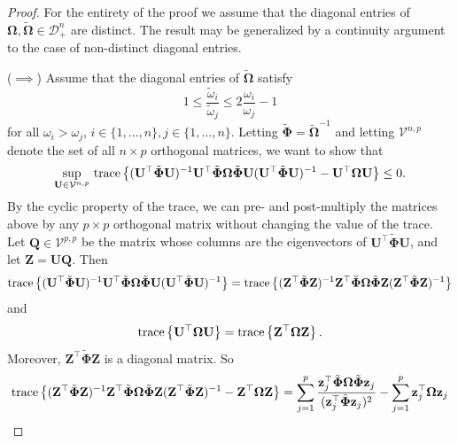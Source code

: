 \documentclass[12pt]{article}
\newcommand{\tr}{\text{\rm trace}}
\newcommand{\bl}[1]{{\mathbf #1}}
\newcommand{\bs}[1]{\boldsymbol #1}
\begin{document}
\begin{proof}

For the entirety of the proof we assume that the diagonal entries of $\bs{\Omega}, \tilde{\bs{\Omega}} \in \mathcal{D}_+^n$ are distinct. The result may be generalized by a continuity argument to the case of non-distinct diagonal entries.

($\implies$) Assume that the diagonal entries of $\tilde{\bs{\Omega}}$ satisfy
\begin{equation*}
    1 \leq \frac{\tilde{\omega}_i}{\tilde{\omega}_j} \leq 2\frac{\omega_i}{\omega_j} - 1
\end{equation*}
for all $\omega_i > \omega_j$, $i \in \{1, \dots, n\}, j \in \{1, \dots, n\}$. Letting $\tilde{\bs{\Phi}} = \tilde{\bs{\Omega}}^{-1}$ and letting $\mathcal{V}^{n,p}$ denote the set of all $n\times p$ orthogonal matrices, we want to show that
\begin{equation}\label{eq:sups2}
    \underset{\bl{U} \in \mathcal{V}^{n,p}}{\sup}~\tr \left\{(\bl{U}^\top \tilde{\bs{\Phi}} \bl{U})^{-1} \bl{U}^\top \tilde{\bs{\Phi}} \bs{\Omega} \tilde{\bs{\Phi}} \bl{U} (\bl{U}^\top \tilde{\bs{\Phi}} \bl{U})^{-1} - \bl{U}^\top \bs{\Omega} \bl{U} \right\} \leq 0.
\end{equation}
By the cyclic property of the trace, we can pre- and post-multiply the matrices above by any $p \times p$ orthogonal matrix without changing the value of the trace. Let $\bl{Q} \in \mathcal{V}^{p,p}$ be the matrix whose columns are the eigenvectors of $\bl{U}^\top \tilde{\bs{\Phi}} \bl{U}$, and let $\bl{Z} = \bl{U}\bl{Q}$. Then
\begin{equation*}
    \tr \left\{(\bl{U}^\top \tilde{\bs{\Phi}} \bl{U})^{-1} \bl{U}^\top \tilde{\bs{\Phi}} \bs{\Omega} \tilde{\bs{\Phi}} \bl{U} (\bl{U}^\top \tilde{\bs{\Phi}} \bl{U})^{-1}\right\} = \tr \left\{(\bl{Z}^\top \tilde{\bs{\Phi}} \bl{Z})^{-1} \bl{Z}^\top \tilde{\bs{\Phi}} \bs{\Omega} \tilde{\bs{\Phi}} \bl{Z} (\bl{Z}^\top \tilde{\bs{\Phi}} \bl{Z})^{-1} \right\} 
\end{equation*}
and
\begin{equation*}
    \tr\left\{ \bl{U}^\top \bs{\Omega} \bl{U} \right\} = \tr\left\{ \bl{Z}^\top \bs{\Omega} \bl{Z} \right\}.
\end{equation*}
Moreover, $\bl{Z}^\top \tilde{\bs{\Phi}} \bl{Z}$ is a diagonal matrix. So
\begin{equation*}
\begin{aligned}
    \tr \left\{(\bl{Z}^\top \tilde{\bs{\Phi}} \bl{Z})^{-1} \bl{Z}^\top \tilde{\bs{\Phi}} \bs{\Omega} \tilde{\bs{\Phi}} \bl{Z} (\bl{Z}^\top \tilde{\bs{\Phi}} \bl{Z})^{-1} - \bl{Z}^\top \bs{\Omega} \bl{Z} \right\} &= \sum_{j=1}^p \frac{\bl{z}_j^\top \tilde{\bs{\Phi}} \bs{\Omega} \tilde{\bs{\Phi}}\bl{z}_j}{(\bl{z}_j^\top \tilde{\bs{\Phi}} \bl{z}_j)^2} - \sum_{j=1}^p \bl{z}_j^\top \bs{\Omega} \bl{z}_j \\

\end{aligned}
\end{equation*}
\end{proof}
\end{document}

